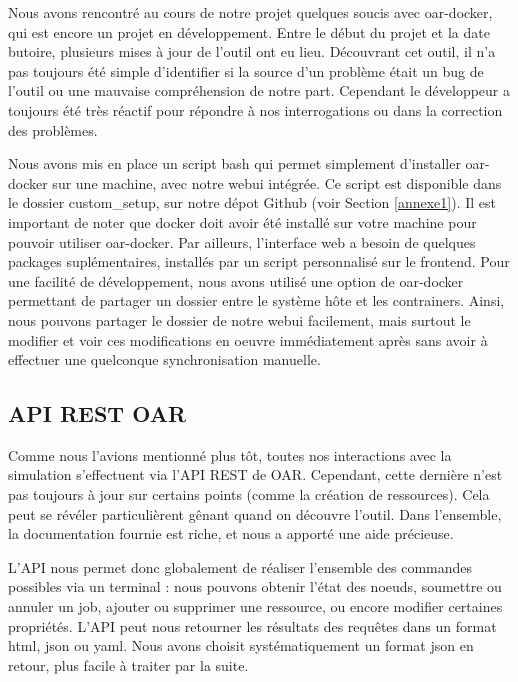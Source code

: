 \documentclass[a4paper,10pt]{article}
\begin{document}
Nous avons rencontré au cours de notre projet quelques soucis avec oar-docker, qui est encore un projet en développement. Entre le début du projet et la date butoire, plusieurs
mises à jour de l'outil ont eu lieu. Découvrant cet outil, il n'a pas toujours été simple d'identifier si la source d'un problème était un bug de l'outil ou une mauvaise compréhension de notre part.
Cependant le développeur a toujours été très réactif pour répondre à nos interrogations ou dans la correction des problèmes.

\vspace{0.5cm}

Nous avons mis en place un script bash qui permet simplement d'installer oar-docker sur une machine, avec notre webui intégrée. Ce script est disponible dans le dossier custom\_setup,
sur notre dépot Github (voir Section \ref{annexe1}). Il est important de noter que docker doit avoir été installé sur votre machine pour pouvoir utiliser oar-docker.
Par ailleurs, l'interface web a besoin de quelques packages suplémentaires, installés par un script personnalisé sur le frontend. Pour une facilité de développement,
nous avons utilisé une option de oar-docker permettant de partager un dossier entre le système hôte et les contrainers. Ainsi, nous pouvons partager le dossier de notre webui facilement, mais surtout le modifier
et voir ces modifications en oeuvre immédiatement après sans avoir à effectuer une quelconque synchronisation manuelle.
\newpage
\subsection{API REST OAR}
Comme nous l'avions mentionné plus tôt, toutes nos interactions avec la simulation s'effectuent via l'API REST de OAR.
Cependant, cette dernière n'est pas toujours à jour sur certains points (comme la création de ressources).
Cela peut se révéler particulièrent gênant quand on découvre l'outil. Dans l'ensemble, la documentation fournie est riche,
et nous a apporté une aide précieuse.
\vspace{0.5cm}

L'API nous permet donc globalement de réaliser l'ensemble des commandes possibles via un terminal : nous pouvons obtenir l'état des noeuds, soumettre ou annuler un job, ajouter ou supprimer une ressource,
ou encore modifier certaines propriétés. L'API peut nous retourner les résultats des requêtes dans un format html, json ou yaml. Nous avons choisit systématiquement un format json en retour,
plus facile à traiter par la suite.
\vspace{0.5cm}
\end{document}

